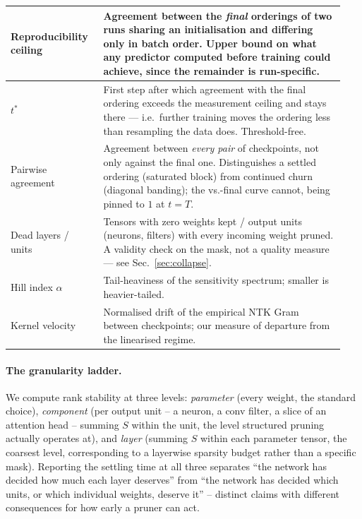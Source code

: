 \documentclass{article}
\begin{document}
\begin{table}[h]
\begin{tabular}{p{0.26\linewidth}p{0.68\linewidth}}
    Reproducibility ceiling & Agreement between the \emph{final} orderings of two runs sharing an initialisation and differing only in batch order. Upper bound on what any predictor computed before training could achieve, since the remainder is run-specific. \\
    \midrule
    $t^*$ & First step after which agreement with the final ordering exceeds the measurement ceiling and stays there --- i.e.\ further training moves the ordering less than resampling the data does. Threshold-free. \\
    Pairwise agreement & Agreement between \emph{every pair} of checkpoints, not only against the final one. Distinguishes a settled ordering (saturated block) from continued churn (diagonal banding); the vs.-final curve cannot, being pinned to $1$ at $t{=}T$. \\
    \midrule
    Dead layers / units & Tensors with zero weights kept / output units (neurons, filters) with every incoming weight pruned. A validity check on the mask, not a quality measure --- see Sec.~\ref{sec:collapse}. \\
    Hill index $\alpha$ & Tail-heaviness of the sensitivity spectrum; smaller is heavier-tailed. \\
    Kernel velocity & Normalised drift of the empirical NTK Gram between checkpoints; our measure of departure from the linearised regime. \\
    \bottomrule
  \end{tabular}
\end{table}

\paragraph{The granularity ladder.}
We compute rank stability at three levels: \emph{parameter} (every weight, the standard
choice), \emph{component} (per output unit -- a neuron, a conv filter, a slice of an
attention head -- summing $S$ within the unit, the level structured pruning actually
operates at), and \emph{layer} (summing $S$ within each parameter tensor, the coarsest
level, corresponding to a layerwise sparsity budget rather than a specific mask). Reporting
the settling time at all three separates ``the network has decided how much each layer
deserves'' from ``the network has decided which units, or which individual weights,
deserve it'' -- distinct claims with different consequences for how early a pruner can act.
\end{document}
